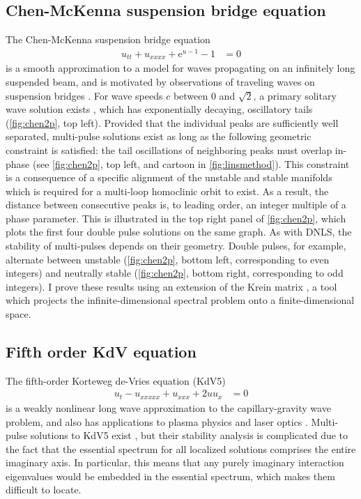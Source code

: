 \documentclass[12pt,reqno,oneside,hidelinks]{article}
\begin{document}
\subsection*{Chen-McKenna suspension bridge equation}

The Chen-McKenna suspension bridge equation 
\begin{align*}
    u_{tt} + u_{xxxx} + \mathrm{e}^{u-1} - 1 &= 0 
\end{align*}
is a smooth approximation to a model for waves propagating on an infinitely long suspended beam, and is motivated by observations of traveling waves on suspension bridges \cite{McKenna1990,Chen1997}. For wave speeds $c$ between 0 and $\sqrt{2}$, a primary solitary wave solution exists \cite{Berg2018}, which has exponentially decaying, oscillatory tails (\cref{fig:chen2p}, top left). Provided that the individual peaks are sufficiently well separated, multi-pulse solutions exist as long as the following geometric constraint is satisfied: the tail oscillations of neighboring peaks must overlap in-phase (see \cref{fig:chen2p}, top left, and cartoon in \cref{fig:linsmethod}). This constraint is a consequence of a specific alignment of the unstable and stable manifolds which is required for a multi-loop homoclinic orbit to exist. As a result, the distance between consecutive peaks is, to leading order, an integer multiple of a phase parameter. This is illustrated in the top right panel of \cref{fig:chen2p}, which plots the first four double pulse solutions on the same graph. As with DNLS, the stability of multi-pulses depends on their geometry. Double pulses, for example, alternate between unstable (\cref{fig:chen2p}, bottom left, corresponding to even integers) and neutrally stable (\cref{fig:chen2p}, bottom right, corresponding to odd integers). I prove these results using an extension of the Krein matrix \cite{Kapitula2020}, a tool which projects the infinite-dimensional spectral problem onto a finite-dimensional space. 

\subsection*{Fifth order KdV equation}

The fifth-order Korteweg de-Vries equation (KdV5)
\begin{align*}
    u_t - u_{xxxxx} + u_{xxx} + 2 u u_x &= 0
\end{align*} 
is a weakly nonlinear long wave approximation to the capillary-gravity wave problem, and also has applications to plasma physics and laser optics \cite{Pelinovsky2007}. Multi-pulse solutions to KdV5 exist \cite{SandstedeStrut}, but their stability analysis is complicated due to the fact that the essential spectrum for all localized solutions comprises the entire imaginary axis. In particular, this means that any purely imaginary interaction eigenvalues would be embedded in the essential spectrum, which makes them difficult to locate.
\end{document}
